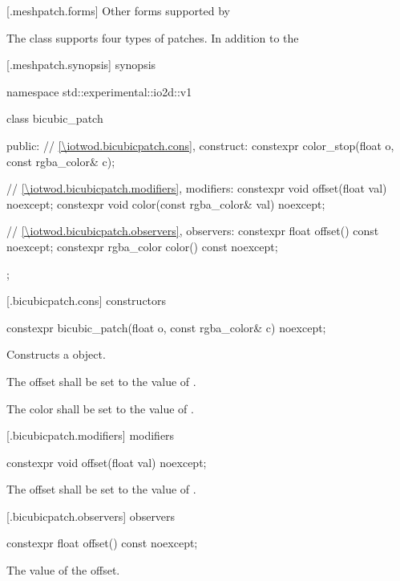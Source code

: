 [\iotwod.meshpatch.forms] {Other forms supported by }

\pnum
The  class supports four types of patches. In addition to the 

 [\iotwod.meshpatch.synopsis] { synopsis}

\begin{codeblock}
namespace std::experimental::io2d::v1 {
  class bicubic_patch {
  public:
  	// \ref{\iotwod.bicubicpatch.cons}, construct:
    constexpr color_stop(float o, const rgba_color& c);
    
    // \ref{\iotwod.bicubicpatch.modifiers}, modifiers:
    constexpr void offset(float val) noexcept;
	constexpr void color(const rgba_color& val) noexcept;
	
    // \ref{\iotwod.bicubicpatch.observers}, observers:
	constexpr float offset() const noexcept;
	constexpr rgba_color color() const noexcept;
  };
}
\end{codeblock}

 [\iotwod.bicubicpatch.cons]{ constructors}

%
\begin{itemdecl}
constexpr bicubic_patch(float o, const rgba_color& c) noexcept;
\end{itemdecl}
\begin{itemdescr}
\pnum
\effects
Constructs a  object.

\pnum
The offset shall be set to the value of .

\pnum
The color shall be set to the value of .
\end{itemdescr}

 [\iotwod.bicubicpatch.modifiers]{ modifiers}

%
\begin{itemdecl}
constexpr void offset(float val) noexcept;
\end{itemdecl}
\begin{itemdescr}
\pnum
\effects
The offset shall be set to the value of .
\end{itemdescr}

 [\iotwod.bicubicpatch.observers]{ observers}

%
\begin{itemdecl}
constexpr float offset() const noexcept;
\end{itemdecl}
\begin{itemdescr}
\pnum
\returns
The value of the offset.
\end{itemdescr}
